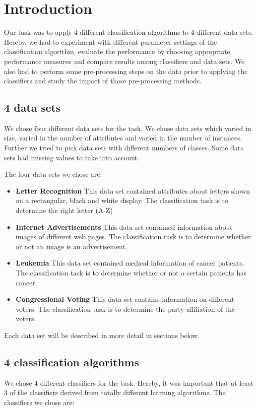 \documentclass{sig-alternate-05-2015}
\begin{document}
{\section{Introduction}
Our task was to apply 4 different classification algorithms to 4 different data sets. Hereby, we had to experiment with different parameter settings of the classification algorithm, evaluate the performance by choosing appropriate performance measures and compare results among classifiers and data sets. We also had to perform some pre-processing steps on the data prior to applying the classifiers and study the impact of those pre-processing methods.

\subsection{4 data sets}
We chose four different data sets for the task. We chose data sets which varied in size, varied in the number of attributes and varied in the number of instances. Further we tried to pick data sets with different numbers of classes. Some data sets had missing values to take into account.

The four data sets we chose are:

\begin{itemize}
\item \textbf{Letter Recognition}
This data set contained attributes about letters shown on a rectangular, black and white display. The classification task is to determine the right letter (A-Z)
\item \textbf{Internet Advertisements}
This data set contained information about images of different web pages. The classification task is to determine whether or not an image is an advertisement.
\item \textbf{Leukemia}
This data set contained medical information of cancer patients. The classification task is to determine whether or not a certain patients has cancer.
\item \textbf{Congressional Voting}
This data set contains information on different voters. The classification task is to determine the party affiliation of the voters.
\end{itemize}

Each data set will be described in more detail in sections below.


\subsection{4 classification algorithms}
We chose 4 different classifiers for the task. Hereby, it was important that at least 3 of the classifiers derived from totally different learning algorithms. The classifiers we chose are:

}
\end{document}
